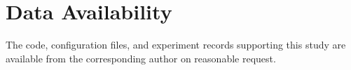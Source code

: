 \documentclass[conference]{IEEEtran}
\begin{document}
\section*{Data Availability}

The code, configuration files, and experiment records supporting this study
are available from the corresponding author on reasonable request.



\end{document}
